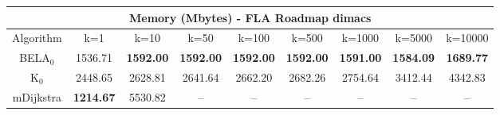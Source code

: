 \begin{tabular}{c|cccccccc}\toprule
\multicolumn{9}{c}{Memory (Mbytes) - FLA Roadmap dimacs}\\ \midrule
Algorithm & k=1 & k=10 & k=50 & k=100 & k=500 & k=1000 & k=5000 & k=10000 \\ \midrule
BELA$_0$ & 1536.71 & \textbf{1592.00} & \textbf{1592.00} & \textbf{1592.00} & \textbf{1592.00} & \textbf{1591.00} & \textbf{1584.09} & \textbf{1689.77} \\
K$_0$ & 2448.65 & 2628.81 & 2641.64 & 2662.20 & 2682.26 & 2754.64 & 3412.44 & 4342.83 \\
mDijkstra & \textbf{1214.67} & 5530.82 & -- & -- & -- & -- & -- & -- \\ \bottomrule 
\end{tabular}
